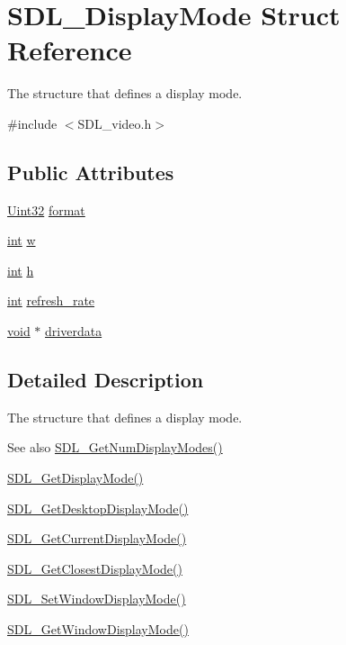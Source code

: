 \hypertarget{structSDL__DisplayMode}{}\section{S\+D\+L\+\_\+\+Display\+Mode Struct Reference}
\label{structSDL__DisplayMode}


The structure that defines a display mode.  




{\ttfamily \#include $<$S\+D\+L\+\_\+video.\+h$>$}

\subsection*{Public Attributes}
\begin{DoxyCompactItemize}
\item 
\hyperlink{SDL__stdinc_8h_add440eff171ea5f55cb00c4a9ab8672d}{Uint32} \hyperlink{structSDL__DisplayMode_ae8120e0a18a99992f039756e1b503680}{format}
\item 
\hyperlink{SDL__thread_8h_a6a64f9be4433e4de6e2f2f548cf3c08e}{int} \hyperlink{structSDL__DisplayMode_a504bb5e21950b719a0df43be51199046}{w}
\item 
\hyperlink{SDL__thread_8h_a6a64f9be4433e4de6e2f2f548cf3c08e}{int} \hyperlink{structSDL__DisplayMode_a0d9eabed50a560ed553af772c26632d7}{h}
\item 
\hyperlink{SDL__thread_8h_a6a64f9be4433e4de6e2f2f548cf3c08e}{int} \hyperlink{structSDL__DisplayMode_ad1b5783c9b292ebf24ad4e0e7a98e540}{refresh\+\_\+rate}
\item 
\hyperlink{SDL__audio_8h_a52835ae37c4bb905b903cbaf5d04b05f}{void} $\ast$ \hyperlink{structSDL__DisplayMode_a411f93025411da873f37a384ae62bbcf}{driverdata}
\end{DoxyCompactItemize}


\subsection{Detailed Description}
The structure that defines a display mode. 

\begin{DoxySeeAlso}{See also}
\hyperlink{SDL__video_8h_a5abcf18592f00019c517e791f8ba53fc}{S\+D\+L\+\_\+\+Get\+Num\+Display\+Modes()} 

\hyperlink{SDL__video_8h_a0a53e003ec6ad24dd2bbbcd0ad297311}{S\+D\+L\+\_\+\+Get\+Display\+Mode()} 

\hyperlink{SDL__video_8h_ab97bca68fc068a6ecc3db473c4c0defd}{S\+D\+L\+\_\+\+Get\+Desktop\+Display\+Mode()} 

\hyperlink{SDL__video_8h_a14dce1cb33085b36f08d27b3d8f2335b}{S\+D\+L\+\_\+\+Get\+Current\+Display\+Mode()} 

\hyperlink{SDL__video_8h_a794be92ee0a9efca226fa19a635fa470}{S\+D\+L\+\_\+\+Get\+Closest\+Display\+Mode()} 

\hyperlink{SDL__video_8h_a2ca17d1e857d1560738e002c9935088a}{S\+D\+L\+\_\+\+Set\+Window\+Display\+Mode()} 

\hyperlink{SDL__video_8h_a8185547bc7cb0bbeb400f459792d081a}{S\+D\+L\+\_\+\+Get\+Window\+Display\+Mode()} 
\end{DoxySeeAlso}


